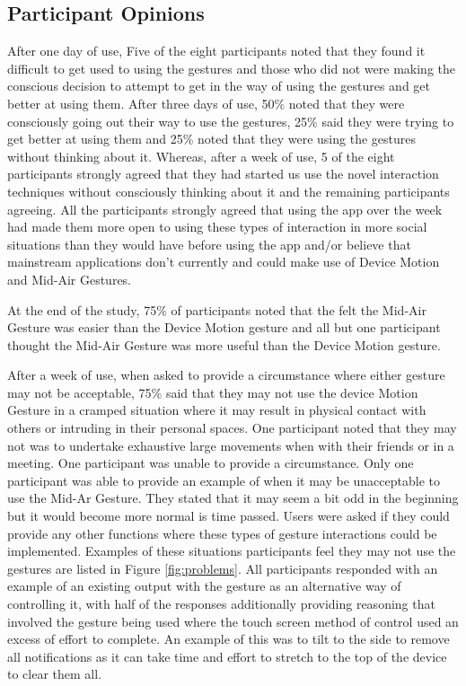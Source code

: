\documentclass{l4proj}
\begin{document}
\subsection{Participant Opinions}
After one day of use, Five of the eight participants noted that they found it difficult to get used to using the gestures and those who did not were making the conscious decision to attempt to get in the way of using the gestures and get better at using them. After three days of use, 50\% noted that they were consciously going out their way to use the gestures, 25\% said they were trying to get better at using them and 25\% noted that they were using the gestures without thinking about it. Whereas, after a week of use, 5 of the eight participants strongly agreed that they had started us use the novel interaction techniques without consciously thinking about it and the remaining participants agreeing. All the participants strongly agreed that using the app over the week had made them more open to using these types of interaction in more social situations than they would have before using the app and/or believe that mainstream applications don't currently and could make use of Device Motion and Mid-Air Gestures.

At the end of the study, 75\% of participants noted that the felt the Mid-Air Gesture was easier than the Device Motion gesture and all but one participant thought the Mid-Air Gesture was more useful than the Device Motion gesture.

After a week of use, when asked to provide a circumstance where either gesture may not be acceptable, 75\% said that they may not use the device Motion Gesture in a cramped situation where it may result in physical contact with others or intruding in their personal spaces. One participant noted that they may not was to undertake exhaustive large movements when with their friends or in a meeting. One participant was unable to provide a circumstance. Only one participant was able to provide an example of when it may be unacceptable to use the Mid-Ar Gesture. They stated that it may seem a bit odd in the beginning but it would become more normal is time passed. Users were asked if they could provide any other functions where these types of gesture interactions could be implemented. Examples of these situations participants feel they may not use the gestures are listed in Figure \ref{fig:problems}. All participants responded with an example of an existing output with the gesture as an alternative way of controlling it, with half of the responses additionally providing reasoning that involved the gesture being used where the touch screen method of control used an excess of effort to complete. An example of this was to tilt to the side to remove all notifications as it can take time and effort to stretch to the top of the device to clear them all.
\end{document}
